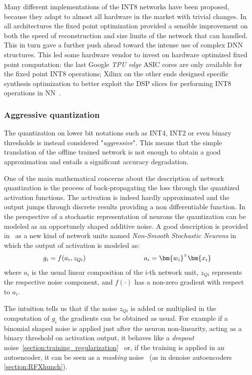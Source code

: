 Many different implementations of the INT8 networks have been proposed, because they adapt to almost all hardware in the market with trivial changes. In all architectures the fixed point optimization provided a sensible improvement on both the speed of reconstruction and size limits of the network that can handled. This in turn gave a further push ahead toward the intense use of complex DNN structures.
This led some hardware vendor to invest on hardware optimized fixed point computation: the last Google \textit{TPU edge} ASIC cores are only available for the fixed point INT8 operations; Xilinx on the other ends designed specific synthesis optimization to better exploit the DSP slices for performing INT8 operations in NN~\cite{xilinx_INT8_DNN}.


\subsubsection{Aggressive quantization}

The quantization on lower bit notations such as INT4, INT2 or even binary thresholds is instead considered "\textit{aggressive}". 
This means that the simple translation of the offline trained network is not enough to obtain a good approximation and entails a significant accuracy degradation.

One of the main mathematical concerns about the description of network quantization is the process of back-propagating the loss through the quantized activation functions. The activation is indeed hardly approximated and the output jumps through discrete results providing a non differentiable function. In the perspective of a stochastic representation of neurons the quantization can be modeled as an opportunely shaped additive noise. A good description is provided in~\cite{bengio2013estimating} as a new kind of network units named \textit{Non-Smooth Stochastic Neurons} in which the output of activation is modeled as:
\begin{equation}
    g_i = f(a_i, z_{Qi})  \hspace{3cm}  a_i = \transpose{\bm{w_i}}\bm{x_i}
    \label{eq:qnn_noise}
\end{equation}
where $a_i$ is the usual linear composition of the i-th network unit, $z_{Qi}$ represents the respective noise component, and $f(\cdot)$ has a non-zero gradient with respect to $a_i$.

The intuition tells us that if the noise $z_{Qi}$ is added or multiplied in the computation of $g_i$ the gradients can be obtained as usual. 
For example if a binomial shaped noise is applied just after the neuron non-linearity, acting as a binary threshold on activation output, it behaves like a \textit{dropout} noise~\cref{section:training_regularization}~\cite{Srivastava:2014:DSW:2627435.2670313} or, if the training is applied in an autoencoder, it can be seen as a \textit{masking} noise~\cite{vincent_et_al_denoise2008} (as in denoise autoencoders \cref{section:RFXhunch}).

